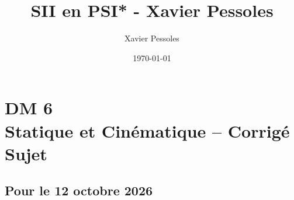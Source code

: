 \documentclass[
	fontsize=10pt, %
	twoside=false, %
]{kaobook}
\newcommand{\repRel}{../../../..}
\newcommand{\repStyle}{\repRel/Style}
\begin{document}

\titlehead{Document Template}
\title[SII en PSI* - Xavier Pessoles]{SII en PSI* - Xavier Pessoles}
\author[XP]{Xavier Pessoles}
\date{\today}

%
\frontmatter %


%
\mainmatter %


\setcounter{margintocdepth}{\sectiontocdepth}
\graphicspath{{\repStyle/png}}

\pagestyle{xp.scrheadings}



\newcommand{\repExo}{}
\newcommand{\nomExo}{}

\livrettrue %
\collefalse\colletrue
\normaltrue

\newcommand{\exer}{\subsection*}

\chapter*{DM 6 \\ 
Statique et Cinématique -- 
\ifprof Corrigé \else Sujet \fi}


\section*{Pour le 12 octobre 2026}



\graphicspath{{\repStyle/png/}{\repExo/images/}{images/}}

\end{document}
